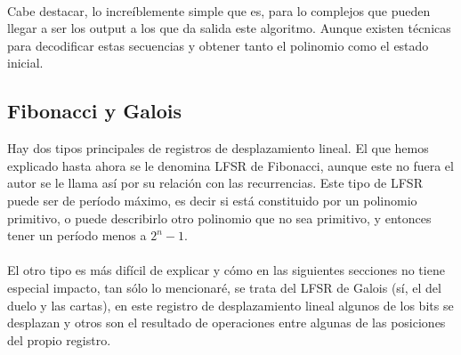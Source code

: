 \\
Cabe destacar, lo increíblemente simple que es, para lo complejos que pueden llegar a ser los output a los que da salida este algoritmo. Aunque existen técnicas para decodificar estas secuencias y obtener tanto el polinomio como el estado inicial. %

\subsection{Fibonacci y Galois}
Hay dos tipos principales de registros de desplazamiento lineal. El que hemos explicado hasta ahora se le denomina LFSR de Fibonacci, aunque este no fuera el autor se le llama así por su relación con las recurrencias. Este tipo de LFSR puede ser de período máximo, es decir si está constituido por un polinomio primitivo, o puede describirlo otro polinomio que no sea primitivo, y entonces tener un período menos a $2^n - 1$. \\\\
El otro tipo es más difícil de explicar y cómo en las siguientes secciones no tiene especial impacto, tan sólo lo mencionaré, se trata del LFSR de Galois (sí, el del duelo y las cartas), en este registro de desplazamiento lineal algunos de los bits se desplazan y otros son el resultado de operaciones entre algunas de las posiciones del propio registro.
\\





